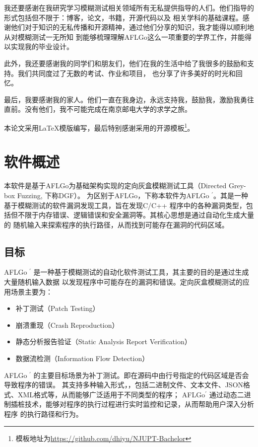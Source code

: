 \documentclass[bachelor]{njupthesis}
\begin{document}
我还要感谢在我研究学习模糊测试相关领域所有无私提供指导的人们。他们指导的形式包括但不限于：博客，论文，书籍，开源代码以及
相关学科的基础课程。感谢他们对于知识的无私传播和开源精神，通过他们分享的知识，我才能得以顺利地从对模糊测试一无所知
到能够梳理理解AFLGo这么一项重要的学界工作，并能得以实现我的毕业设计。

此外，我还要感谢我的同学们和朋友们，他们在我的生活中给了我很多的鼓励和支持。我们共同度过了无数的考试、作业和项目，
也分享了许多美好的时光和回忆。

最后，我要感谢我的家人。他们一直在我身边，永远支持我，鼓励我，激励我勇往直前。没有他们，我不可能完成在南京邮电大学的求学之旅。

本论文采用\LaTeX 模版编写，最后特别感谢采用的开源模板\footnote{模板地址为\url{https://github.com/dhiyu/NJUPT-Bachelor}}。

\thesisreference

\thesisappendix

\section{软件概述}
本软件是基于AFLGo为基础架构实现的定向灰盒模糊测试工具（Directed Grey-box Fuzzing, 下称DGF）。
为区别于AFLGo，下称本软件为AFLGo $^\prime$。其是一种基于模糊测试的软件漏洞发现工具，旨在发现C/C++
程序中的各种漏洞类型，包括但不限于内存错误、逻辑错误和安全漏洞等。其核心思想是通过自动化生成大量的
随机输入来探索程序的执行路径，从而找到可能存在漏洞的代码区域。
\subsection{目标}
AFLGo $^\prime$ 是一种基于模糊测试的自动化软件测试工具，其主要的目的是通过生成大量随机输入数据
以发现程序中可能存在的漏洞和错误。定向灰盒模糊测试的应用场景主要为：
\begin{itemize}[leftmargin=36pt]
	\item 补丁测试（Patch Testing）
	\item 崩溃重现（Crash Reproduction）
	\item 静态分析报告验证（Static Analysis Report Verification）
	\item 数据流检测（Information Flow Detection）
\end{itemize}
AFLGo $^\prime$ 的主要目标场景为补丁测试。即在源码中由行号指定的代码区域是否会导致程序的错误。
其支持多种输入形式，，包括二进制文件、文本文件、JSON格式、XML格式等，从而能够广泛适用于不同类型的程序；
AFLGo$^\prime$ 通过动态二进制插桩技术，能够对程序的执行过程进行实时监控和记录，从而帮助用户深入分析程序
的执行路径和行为。
\end{document}
